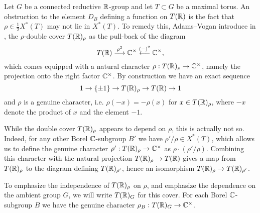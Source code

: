 \documentclass{article}
\theoremstyle{definition}
\numberwithin{equation}{section}
\renewcommand{\-}{\hyp{}}
\begin{document}
Let $G$ be a connected reductive $\mathbb{R}$-group and let $T \subset G$ be a maximal torus. An obstruction to the element $D_B$ defining a function on $T(\mathbb{R})$ is the fact that $\rho \in \frac{1}{2}X^*(T)$ may not lie in $X^*(T)$. To remedy this, Adams--Vogan introduce in \cite{AV92}, \cite{AV16} the $\rho$-double cover $T(\mathbb{R})_\rho$ as the pull-back of the diagram
\[ T(\mathbb{R})\stackrel{\rho^2}{\longrightarrow} \mathbb{C}^\times \stackrel{(-)^2}{\longleftarrow} \mathbb{C}^\times, \]
which comes equipped with a natural character $\rho : T(\mathbb{R})_\rho \to \mathbb{C}^\times$, namely the projection onto the right factor $\mathbb{C}^\times$. By construction we have an exact sequence
\[ 1 \to \{\pm 1\} \to T(\mathbb{R})_\rho \to T(\mathbb{R}) \to 1 \]
and $\rho$ is a genuine character, i.e. $\rho(-x)=-\rho(x)$ for $x \in T(\mathbb{R})_\rho$, where $-x$ denote the product of $x$ and the element $-1$.

While the double cover $T(\mathbb{R})_\rho$ appears to depend on $\rho$, this is actually not so. Indeed, for any other Borel $\mathbb{C}$-subgroup $B'$ we have $\rho'/\rho \in X^*(T)$, which allows us to define the genuine character $\rho' : T(\mathbb{R})_\rho \to \mathbb{C}^\times$ as $\rho \cdot (\rho'/\rho)$. Combining this character with the natural projection $T(\mathbb{R})_\rho \to T(\mathbb{R})$ gives a map from $T(\mathbb{R})_\rho$ to the diagram defining $T(\mathbb{R})_{\rho'}$, hence an isomorphism $T(\mathbb{R})_\rho \to T(\mathbb{R})_{\rho'}$.

To emphasize the independence of $T(\mathbb{R})_\rho$ on $\rho$, and emphasize the dependence on the ambient group $G$, we will write $T(\mathbb{R})_G$ for this cover. For each Borel $\mathbb{C}$-subgroup $B$ we have the genuine character $\rho_B : T(\mathbb{R})_G \to \mathbb{C}^\times$.
\end{document}
